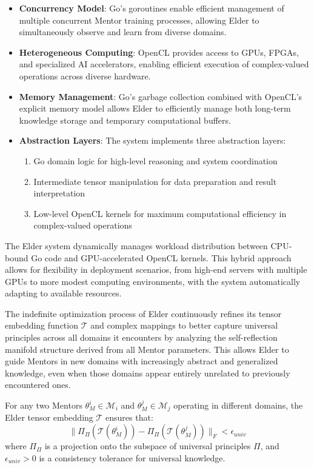 \begin{itemize}
    \item \textbf{Concurrency Model}: Go's goroutines enable efficient management of multiple concurrent Mentor training processes, allowing Elder to simultaneously observe and learn from diverse domains.
    
    \item \textbf{Heterogeneous Computing}: OpenCL provides access to GPUs, FPGAs, and specialized AI accelerators, enabling efficient execution of complex-valued operations across diverse hardware.
    
    \item \textbf{Memory Management}: Go's garbage collection combined with OpenCL's explicit memory model allows Elder to efficiently manage both long-term knowledge storage and temporary computational buffers.
    
    \item \textbf{Abstraction Layers}: The system implements three abstraction layers:
    \begin{enumerate}
        \item Go domain logic for high-level reasoning and system coordination
        \item Intermediate tensor manipulation for data preparation and result interpretation
        \item Low-level OpenCL kernels for maximum computational efficiency in complex-valued operations
    \end{enumerate}
\end{itemize}

The Elder system dynamically manages workload distribution between CPU-bound Go code and GPU-accelerated OpenCL kernels. This hybrid approach allows for flexibility in deployment scenarios, from high-end servers with multiple GPUs to more modest computing environments, with the system automatically adapting to available resources.

The indefinite optimization process of Elder continuously refines its tensor embedding function $\mathcal{T}$ and complex mappings to better capture universal principles across all domains it encounters by analyzing the self-reflection manifold structure derived from all Mentor parameters. This allows Elder to guide Mentors in new domains with increasingly abstract and generalized knowledge, even when those domains appear entirely unrelated to previously encountered ones.

\begin{theorem}
For any two Mentors $\theta_M^i \in \mathcal{M}_i$ and $\theta_M^j \in \mathcal{M}_j$ operating in different domains, the Elder tensor embedding $\mathcal{T}$ ensures that:
\begin{equation}
\| \Pi_{\Pi}(\mathcal{T}(\theta_M^i)) - \Pi_{\Pi}(\mathcal{T}(\theta_M^j)) \|_F < \epsilon_{univ}
\end{equation}
where $\Pi_{\Pi}$ is a projection onto the subspace of universal principles $\Pi$, and $\epsilon_{univ} > 0$ is a consistency tolerance for universal knowledge.
\end{theorem}

